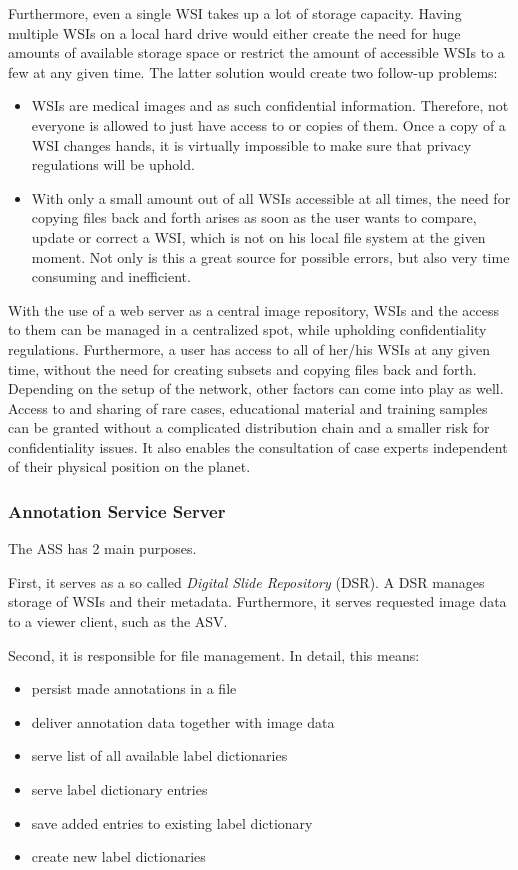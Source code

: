 Furthermore, even a single WSI takes up a lot of storage capacity\cite{Singh11}. Having multiple WSIs on a local hard drive would either create the need for huge amounts of available storage space or restrict the amount of accessible WSIs to a few at any given time. The latter solution would create two follow-up problems:
\begin{itemize}
	\item WSIs are medical images and as such confidential information. Therefore, not everyone is allowed to just have access to or copies of them\cite{COA}\cite{USSanDiego}. Once a copy of a WSI changes hands, it is virtually impossible to make sure that privacy regulations will be uphold.	
	\item With only a small amount out of all WSIs accessible at all times, the need for copying files back and forth arises as soon as the user wants to compare, update or correct a WSI, which is not on his local file system at the given moment. Not only is this a great source for possible errors, but also very time consuming and inefficient.
\end{itemize}

With the use of a web server as a central image repository, WSIs and the access to them can be managed in a centralized spot, while upholding confidentiality regulations. Furthermore, a user has access to all of her/his WSIs at any given time, without the need for creating subsets and copying files back and forth. Depending on the setup of the network, other factors can come into play as well. Access to and sharing of rare cases, educational material and training samples can be granted without a complicated distribution chain and a smaller risk for confidentiality issues. It also enables the consultation of case experts independent of their physical position on the planet\cite{Wilbur09}.


\subsubsection{Annotation Service Server}
The ASS has 2 main purposes.

First, it serves as a so called \emph{Digital Slide Repository} (DSR). A DSR manages storage of WSIs and their metadata. Furthermore, it serves requested image data to a viewer client, such as the ASV\cite{Cornish13}. 

Second, it is responsible for file management. In detail, this means:
\begin{itemize}
	\item persist made annotations in a file
	\item deliver annotation data together with image data
	\item serve list of all available label dictionaries
	\item serve label dictionary entries
	\item save added entries to existing label dictionary
	\item create new label dictionaries
\end{itemize}




